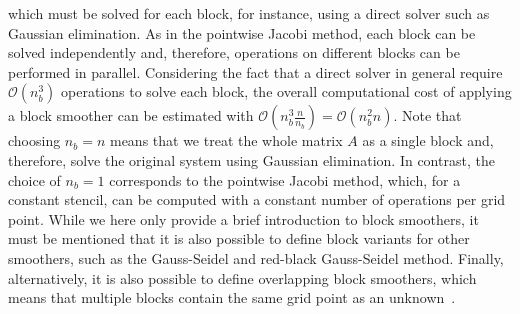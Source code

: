 which must be solved for each block, for instance, using a direct solver such as Gaussian elimination.
As in the pointwise Jacobi method, each block can be solved independently and, therefore, operations on different blocks can be performed in parallel. 
Considering the fact that a direct solver in general require $\mathcal{O}(n_b^3)$ operations to solve each block, the overall computational cost of applying a block smoother can be estimated with $\mathcal{O}(n_b^3 \frac{n}{n_b}) = \mathcal{O}(n_b^2 n)$.
Note that choosing $n_b = n$ means that we treat the whole matrix $A$ as a single block and, therefore, solve the original system using Gaussian elimination.
In contrast, the choice of $n_b = 1$ corresponds to the pointwise Jacobi method, which, for a constant stencil, can be computed with a constant number of operations per grid point.
While we here only provide a brief introduction to block smoothers, it must be mentioned that it is also possible to define block variants for other smoothers, such as the Gauss-Seidel and red-black Gauss-Seidel method.
Finally, alternatively, it is also possible to define overlapping block smoothers, which means that multiple blocks contain the same grid point as an unknown~\cite{trottenberg2000multigrid}.


